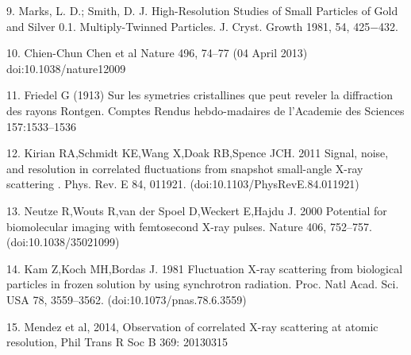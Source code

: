 \documentclass [11pt,fleqn]{article}
\begin{document}
9. Marks, L. D.; Smith, D. J. High-Resolution Studies of Small Particles of Gold and Silver 0.1. Multiply-Twinned Particles. J. Cryst. Growth 1981, 54, 425−432.

10. Chien-Chun Chen et al Nature 496, 74–77 (04 April 2013) doi:10.1038/nature12009

11. Friedel G (1913) Sur les symetries cristallines que peut reveler la diffraction des rayons Rontgen. Comptes Rendus hebdo-madaires de l’Academie des Sciences 157:1533–1536

12. Kirian RA,Schmidt KE,Wang X,Doak RB,Spence JCH. 2011 Signal, noise, and resolution in correlated fluctuations from snapshot small-angle X-ray scattering . Phys. Rev. E 84, 011921. (doi:10.1103/PhysRevE.84.011921)

13. Neutze R,Wouts R,van der Spoel D,Weckert E,Hajdu J. 2000 Potential for biomolecular imaging with femtosecond X-ray pulses. Nature 406, 752–757. (doi:10.1038/35021099)


14. Kam Z,Koch MH,Bordas J. 1981 Fluctuation X-ray scattering from biological particles in frozen solution by using synchrotron radiation. Proc. Natl Acad. Sci. USA 78, 3559–3562. (doi:10.1073/pnas.78.6.3559)

15. Mendez et al, 2014,  Observation of correlated X-ray scattering at atomic resolution, Phil Trans R Soc B 369: 20130315
\end{document}
